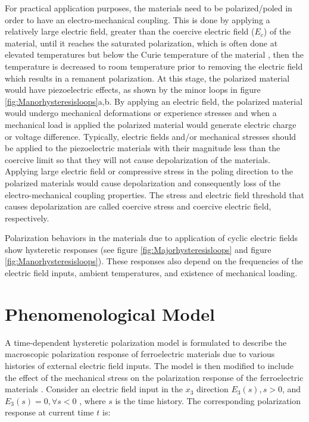 For practical application purposes, the materials need to be polarized/poled in order to have an electro-mechanical coupling. 
This is done by applying a relatively large electric field, greater than the coercive electric field ($E_c$) of the material,
 until it reaches the saturated polarization,
  which is often done at elevated temperatures but below the Curie temperature of the material \cite{Lines1977},
   then the temperature is decreased to room temperature prior to removing the electric field which results in a remanent polarization. 
At this stage, the polarized material would have piezoelectric effects, as shown by the minor loops in figure \ref{fig:Manorhysteresisloops}a,b. 
By applying an electric field, the polarized material would undergo mechanical deformations or experience stresses and when a mechanical load is applied the polarized material would generate electric charge or voltage difference. 
Typically, electric fields and/or mechanical stresses should be applied to the piezoelectric materials with their magnitude less than the coercive limit so that they will not cause depolarization of the materials. 
Applying large electric field or compressive stress in the poling direction to the polarized materials would cause depolarization and  consequently loss of the electro-mechanical coupling properties. 
The stress and electric field threshold that causes depolarization are called coercive stress and coercive electric field, respectively\cite{Sohrabi201344}.

Polarization behaviors in the materials due to application of cyclic electric fields show hysteretic responses (see figure \ref{fig:Majorhysteresisloops} and figure \ref{fig:Manorhysteresisloops}). 
These responses also depend on the frequencies of the electric field inputs, ambient temperatures, and existence of mechanical loading. 

\section{Phenomenological Model}
A time-dependent hysteretic polarization model is formulated to describe the macroscopic polarization response of ferroelectric materials
 due to various histories of external electric field inputs. 
The model is then modified to include the effect of the mechanical stress on the
 polarization response of the ferroelectric materials \cite{Muliana2011,Sohrabi201344}.
Consider an electric field input in the $x_3$ direction $E_3(s),s>0$,  and $E_3(s)=0,\forall s<0$  , where $s$ is the time history.  
The corresponding polarization response at current time $t$ is:

